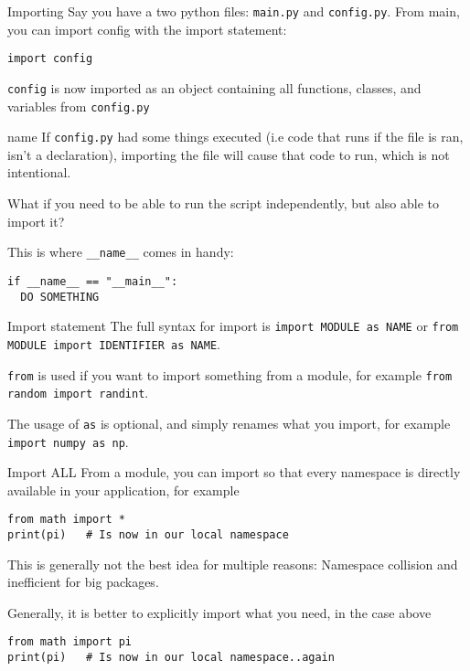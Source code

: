 \begin{frame}[containsverbatim]{Importing}
  Say you have a two python files: \verb|main.py| and \verb|config.py|. From main, you can import config with the import statement:

  \begin{verbatim}
import config
  \end{verbatim}

  \verb|config| is now imported as an object containing all functions, classes, and variables from \verb|config.py|
\end{frame}

\begin{frame}[fragile]{name}
  If \verb|config.py| had some things executed (i.e code that runs if the file is ran, isn't a declaration), importing the file will cause that code to run, which is not intentional. \pause

  What if you need to be able to run the script independently, but also able to import it? \pause

  This is where \verb|__name__| comes in handy:
    \begin{verbatim}
if __name__ == "__main__":
  DO SOMETHING
  \end{verbatim}
\end{frame}

\begin{frame}[containsverbatim]{Import statement}
  The full syntax for import is \texttt{import MODULE as NAME} or \texttt{from MODULE import IDENTIFIER as NAME}.

  \verb|from| is used if you want to import something from a module, for example \texttt{from random import randint}.

  The usage of \verb|as| is optional, and simply renames what you import, for example \texttt{import numpy as np}.
\end{frame}

\begin{frame}[containsverbatim]{Import ALL}
  From a module, you can import so that every namespace is directly available in your application, for example

  \begin{verbatim}
from math import *
print(pi)   # Is now in our local namespace
  \end{verbatim}

  This is generally not the best idea for multiple reasons: Namespace collision and inefficient for big packages.

  Generally, it is better to explicitly import what you need, in the case above
    \begin{verbatim}
from math import pi
print(pi)   # Is now in our local namespace..again
  \end{verbatim}
\end{frame}

